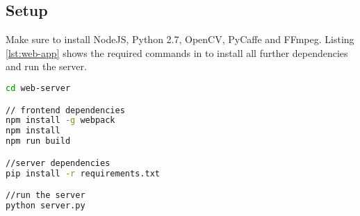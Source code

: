 \subsection{Setup}
Make sure to install NodeJS, Python 2.7, OpenCV, PyCaffe and FFmpeg.
Listing \ref{lst:web-app} shows the required commands in to install all further dependencies and run the server.

\begin{lstlisting}[language=sh, caption=Web Application Setup, label=lst:web-app]
cd web-server

// frontend dependencies
npm install -g webpack
npm install
npm run build

//server dependencies
pip install -r requirements.txt

//run the server
python server.py
\end{lstlisting}
